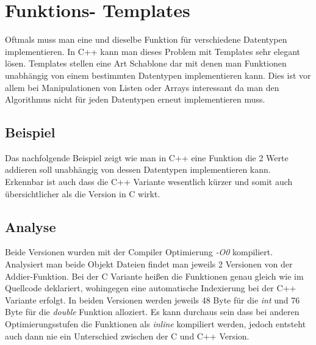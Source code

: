 \documentclass[MES,Master,ngerman]{twbook}%
\begin{document}
\newpage

\section{Funktions- Templates}
Oftmals muss man eine und dieselbe Funktion für verschiedene Datentypen implementieren. In C++ kann man dieses Problem mit Templates sehr elegant lösen. Templates stellen eine Art Schablone dar mit denen man Funktionen unabhängig von einem bestimmten Datentypen implementieren kann. Dies ist vor allem bei Manipulationen von Listen oder Arrays interessant da man den Algorithmus nicht für jeden Datentypen erneut implementieren muss.

\subsection{Beispiel}
Das nachfolgende Beispiel zeigt wie man in C++ eine Funktion die 2 Werte addieren soll unabhängig von dessen Datentypen implementieren kann. Erkennbar ist auch dass die C++ Variante wesentlich kürzer und somit auch übersichtlicher als die Version in C wirkt.
\begin{figure}[!htb]
	\begin{subfigure}[b]{0.5\textwidth}
		
		\label{fig:5}
	\end{subfigure}
	\begin{subfigure}[b]{0.5\textwidth}
		
		\label{fig:6}
	\end{subfigure}
\end{figure}
\subsection{Analyse}

Beide Versionen wurden mit der Compiler Optimierung \textit{-O0} kompiliert. Analysiert man beide Objekt Dateien findet man jeweils 2 Versionen von der Addier-Funktion. Bei der C Variante heißen die Funktionen genau gleich wie im Quellcode deklariert, wohingegen eine automatische Indexierung bei der C++ Variante erfolgt. In beiden Versionen werden jeweils 48 Byte für die \textit{int} und 76 Byte für die \textit{double} Funktion alloziert. Es kann durchaus sein dass bei anderen Optimierungsstufen die Funktionen als \textit{inline} kompiliert werden, jedoch entsteht auch dann nie ein Unterschied zwischen der C und C++ Version.
\end{document}
